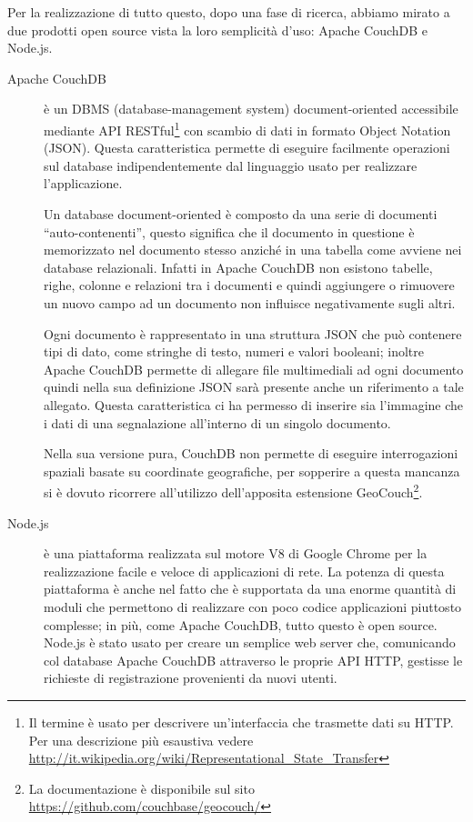 		Per la realizzazione di tutto questo, dopo una fase di ricerca, abbiamo
		mirato a due prodotti open source vista la loro semplicità d'uso:
		Apache CouchDB\texttrademark{} e Node.js.
		\begin{description}
			\item[Apache CouchDB\texttrademark{}] è un DBMS (database-management
				system) doc\-u\-ment-ori\-ented accessibile mediante API RESTful\footnote{Il termine è usato
				per descrivere un'interfaccia che trasmette dati su HTTP. Per una
				descrizione più esaustiva vedere
				\url{http://it.wikipedia.org/wiki/Representational_State_Transfer}}
				con scambio di dati in formato \js{} Object Notation (JSON). Questa
				caratteristica permette di eseguire facilmente operazioni sul database
				indipendentemente dal linguaggio usato per realizzare l'applicazione.
				
				Un database document-oriented è composto da una serie di documenti
				``auto-contenenti'', questo significa che il documento in
				questione è memorizzato nel documento stesso anziché in una tabella
				come avviene nei database relazionali. Infatti in Apache CouchDB\texttrademark{}
				non esistono tabelle, righe, colonne e relazioni tra i
				documenti e quindi aggiungere o rimuovere un nuovo
				campo ad un documento non influisce negativamente sugli altri.
				
				Ogni documento è rappresentato in una struttura JSON che può
				contenere tipi di dato, come stringhe di testo, numeri e valori
				booleani; inoltre Apache CouchDB\texttrademark{} permette
				di allegare file multimediali ad ogni documento quindi nella sua
				definizione JSON sarà presente anche un riferimento a tale allegato. 
				Questa caratteristica ci ha permesso di inserire sia l'immagine che
				i dati di una segnalazione all'interno di un singolo documento.
				
				Nella sua versione pura, CouchDB non permette di eseguire interrogazioni 
				spaziali basate su coordinate geografiche, per sopperire a questa
				mancanza si è dovuto ricorrere all'utilizzo dell'apposita estensione
				GeoCouch\footnote{La documentazione 
				è disponibile sul sito \url{https://github.com/couchbase/geocouch/}}.
			\item[Node.js] è una piattaforma realizzata sul motore \js{} V8 di
				Google Chrome per la realizzazione facile e veloce di
				applicazioni di rete. La potenza di questa piattaforma è anche
				nel fatto che è supportata da una enorme quantità di moduli
				che permettono di realizzare con poco codice applicazioni piuttosto
				complesse; in più, come Apache CouchDB\texttrademark{}, tutto 
				questo è open source. Node.js è stato usato per creare un
				semplice web server che, comunicando col database Apache CouchDB\texttrademark{}
				attraverso le proprie API HTTP, gestisse le richieste di
				registrazione provenienti da nuovi utenti.
		\end{description}
		
